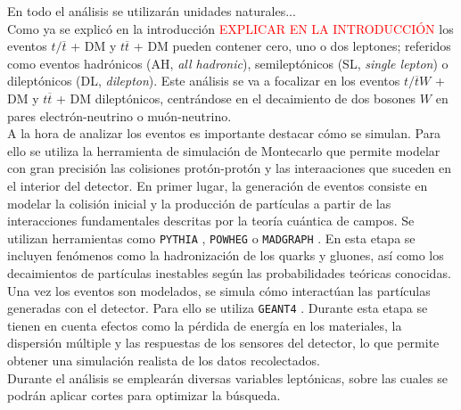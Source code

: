 En todo el análisis se utilizarán unidades naturales...\\


Como ya se explicó en la introducción \textcolor{red}{EXPLICAR EN LA INTRODUCCIÓN} los eventos $t/\overline{t}$ + DM y $t\overline{t}$ + DM pueden contener cero, uno o dos leptones; referidos como eventos hadrónicos (AH, \textit{all hadronic}), semileptónicos (SL, \textit{single lepton}) o dileptónicos (DL, \textit{dilepton}). Este análisis se va a focalizar en los eventos $t/\overline{t}W$ + DM y $t\overline{t}$ + DM dileptónicos, centrándose en el decaimiento de dos bosones $W$ en pares electrón-neutrino o muón-neutrino. \\

A la hora de analizar los eventos es importante destacar cómo se simulan. Para ello se utiliza la herramienta de simulación de Montecarlo que permite modelar con gran precisión las colisiones protón-protón y las interaaciones que suceden en el interior del detector. En primer lugar, la generación de eventos consiste en modelar la colisión inicial y la producción de partículas a partir de las interacciones fundamentales descritas por la teoría cuántica de campos. Se utilizan herramientas como \texttt{PYTHIA} \cite{PYTHIA}, \texttt{POWHEG} \cite{POWHEG} o \texttt{MADGRAPH} \cite{MADGRAPH} . En esta etapa se incluyen fenómenos como la hadronización de los quarks y gluones, así como los decaimientos de partículas inestables según las probabilidades teóricas conocidas. Una vez los eventos son modelados, se simula cómo interactúan las partículas generadas con el detector. Para ello se utiliza \texttt{GEANT4} \cite{GEANT4}. Durante esta etapa se tienen en cuenta efectos como la pérdida de energía en los materiales, la dispersión múltiple y las respuestas de los sensores del detector, lo que permite obtener una simulación realista de los datos recolectados.\\


Durante el análisis se emplearán diversas variables leptónicas, sobre las cuales se podrán aplicar cortes para optimizar la búsqueda.


